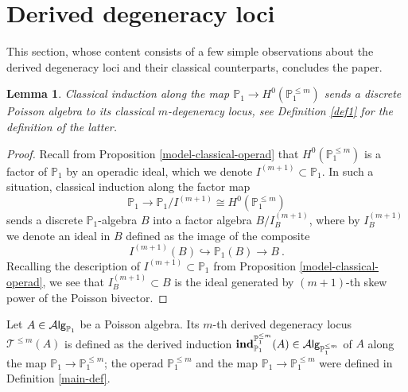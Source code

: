 \documentclass[10pt, oneside]{amsart}
\theoremstyle{plain}
\newtheorem{lemma}[equation]{Lemma}
\newcommand{\Alg}{\mathcal{A}\text{\sf lg}}
\newcommand{\Ind}{\mathbf{ind}}
\newcommand{\PP}{\mathbb{P}}
\newcommand{\T}{\mathcal{T}}
\begin{document}


\section{Derived degeneracy loci}\label{sec5}

This section, whose content consists of a few simple observations about the derived degeneracy loci and their classical counterparts,
concludes the paper.

\begin{lemma}\label{loci-class}
Classical induction along the map $\PP_1 \longrightarrow H^0(\PP_1^{\le m})$ sends a discrete Poisson algebra to its classical
$m$-degeneracy locus, see Definition \ref{def1} for the definition of the latter.
\end{lemma}

\begin{proof}
Recall from Proposition \ref{model-classical-operad} that $H^0(\PP_1^{\le m})$ is a factor of $\PP_1$ by an operadic ideal, which we 
denote $I^{(m+1)} \subset \PP_1$. In such a situation, classical induction along the factor map
\begin{equation*}
\PP_1 \longrightarrow \PP_1 / I^{(m+1)} \cong H^0(\PP_1^{\le m})
\end{equation*}
sends a discrete $\PP_1$-algebra $B$ into a factor algebra $B/I^{(m+1)}_B$, where by $I^{(m+1)}_B$ we denote an ideal in $B$ defined
as the image of the composite
\begin{equation*}
I^{(m+1)} (B) \hookrightarrow \PP_1(B) \longrightarrow B \:.
\end{equation*}
Recalling the description of $I^{(m+1)} \subset \PP_1$ from Proposition \ref{model-classical-operad}, we see that
$I^{(m+1)}_B \subset B$ is the ideal generated by $(m+1)$-th skew power of the Poisson bivector.
\end{proof}

\begin{definition}\label{der-degen-loci-def}
Let $A \in \Alg_{\PP_1}$ be a Poisson algebra. Its $m$-th derived degeneracy locus $\T^{\le m}(A)$ is defined as the derived induction
$\Ind^{\PP_1^{\le m}}_{\PP_1}(A) \in \Alg_{\PP_1^{\le m}}$ of $A$ along the map $\PP_1 \longrightarrow \PP_1^{\le m}$;
the operad $\PP_1^{\le m}$ and the map $\PP_1 \longrightarrow \PP_1^{\le m}$ were defined in Definition \ref{main-def}.
\end{definition}
\end{document}
